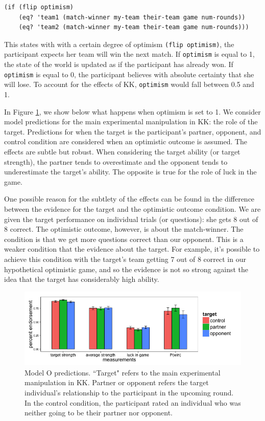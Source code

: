 \documentclass{article}
\begin{document}
\begin{lstlisting}
(if (flip optimism) 
    (eq? 'team1 (match-winner my-team their-team game num-rounds)) 
    (eq? 'team2 (match-winner my-team their-team game num-rounds)))
\end{lstlisting}

This states with with a certain degree of optimism \lstinline{(flip optimism)}, the participant expects her team will win the next match. If \lstinline{optimism} is equal to 1, the state of the world is updated as if the participant has already won. If  \lstinline{optimism} is equal to 0, the participant believes with absolute certainty that she will lose. To account for the effects of KK, \lstinline{optimism} would fall between 0.5 and 1. 

In Figure \ref{fig:modelo}, we show below what happens when optimism is set to 1. We consider model predictions for the main experimental manipulation in KK: the role of the target. Predictions for when the target is the participant's partner, opponent, and control condition are considered when an optimistic outcome is assumed. The effects are subtle but robust. When considering the target ability (or target strength), the partner tends to overestimate and the opponent tends to underestimate the target's ability. The opposite is true for the role of luck in the game. 

One possible reason for the subtlety of the effects can be found in the difference between the evidence for the target and the optimistic outcome condition. We are given the target performance on individual trials (or questions): she gets 8 out of 8 correct. The optimistic outcome, however, is about the match-winner. The condition is that we get more questions correct than our opponent. This is a weaker condition that the evidence about the target. For example, it's possible to achieve this condition with the target's team getting 7 out of 8 correct in our hypothetical optimistic game, and so the evidence is not so strong against the idea that the target has considerably high ability. 

\begin{figure}
\centering
    \includegraphics[width=\columnwidth]{modelO-predictions}
    \caption{Model O predictions. ``Target" refers to the main experimental manipulation in KK. Partner or opponent refers the target individual's relationship to the participant in the upcoming round. In the control condition, the participant rated an individual who was neither going to be their partner nor opponent.}
      \label{fig:modelo}
\end{figure}
\end{document}
